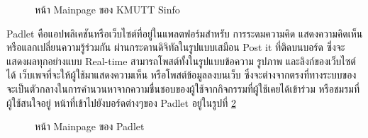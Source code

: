 \documentclass[14pt,oneside,openright,a4paper]{cpe-thai-project}
\begin{document}
  \begin{figure}[!h]\centering
    \setlength{\fboxrule}{0.5mm} %
    \setlength{\fboxsep}{0.5cm}
    \caption{หน้า Mainpage ของ KMUTT Sinfo}\label{fig:sinfo}
    \end{figure}

\newpage

Padlet คือแอปพลิเคชันหรือเว็บไซต์ที่อยู่ในแพลตฟอร์มสำหรับ การระดมความคิด แสดงความคิดเห็น หรือแลกเปลี่ยนความรู้ร่วมกัน ผ่านกระดานดิจิทัลในรูปแบบเสมือน Post it ที่ติดบนบอร์ด ซึ่งจะแสดงผลทุกอย่างแบบ Real-time สามารถโพสต์ทั้งในรูปแบบข้อความ รูปภาพ และลิงก์ของเว็บไซต์ได้ เว็บเพจที่จะให้ผู้ใช้มาแสดงความเห็น หรือโพสต์ข้อมูลลงบนเว็บ ซึ่งจะต่างจากตรงที่ทางระบบของจะเป็นตัวกลางในการคำนวนหาจากความชื่นชอบของผู้ใช้จากกิจกรรมที่ผู้ใช้เคยได้เข้าร่วม หรือชมรมที่ผู้ใช้สนใจอยู่ หน้าที่เข้าไปยังบอร์ดต่างๆของ Padlet อยู่ในรูปที่ \ref{fig:padlet}

  \begin{figure}[!h]\centering
    \setlength{\fboxrule}{0.5mm} %
    \setlength{\fboxsep}{0.5cm}
    \caption{หน้า Mainpage ของ Padlet}\label{fig:padlet}
    \end{figure}
\end{document}
